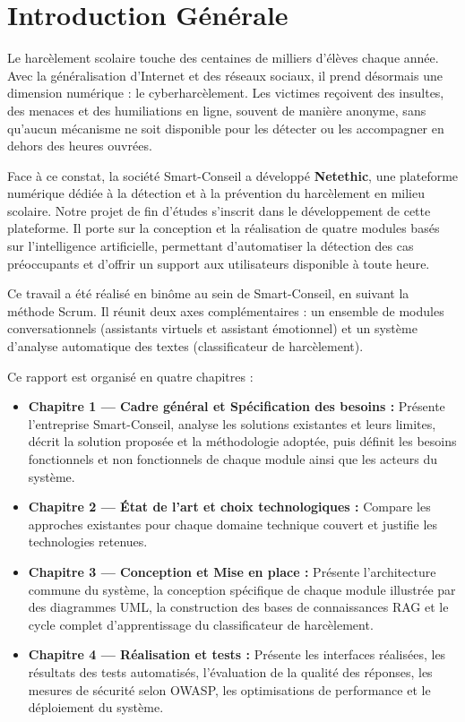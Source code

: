 
\chapter*{Introduction Générale}

Le harcèlement scolaire touche des centaines de milliers d'élèves chaque année.
Avec la généralisation d'Internet et des réseaux sociaux, il prend désormais une dimension numérique : le cyberharcèlement.
Les victimes reçoivent des insultes, des menaces et des humiliations en ligne, souvent de manière anonyme,
sans qu'aucun mécanisme ne soit disponible pour les détecter ou les accompagner en dehors des heures ouvrées.

\bigskip

Face à ce constat, la société Smart-Conseil a développé \textbf{Netethic}, une plateforme numérique dédiée
à la détection et à la prévention du harcèlement en milieu scolaire.
Notre projet de fin d'études s'inscrit dans le développement de cette plateforme.
Il porte sur la conception et la réalisation de quatre modules basés sur l'intelligence artificielle,
permettant d'automatiser la détection des cas préoccupants et d'offrir un support aux utilisateurs
disponible à toute heure.

\bigskip

Ce travail a été réalisé en binôme au sein de Smart-Conseil, en suivant la méthode Scrum.
Il réunit deux axes complémentaires : un ensemble de modules conversationnels (assistants virtuels et assistant émotionnel)
et un système d'analyse automatique des textes (classificateur de harcèlement).

\bigskip

Ce rapport est organisé en quatre chapitres :

\begin{itemize}
  \item \textbf{Chapitre 1 — Cadre général et Spécification des besoins :}
        Présente l'entreprise Smart-Conseil, analyse les solutions existantes et leurs limites,
        décrit la solution proposée et la méthodologie adoptée, puis définit les besoins
        fonctionnels et non fonctionnels de chaque module ainsi que les acteurs du système.
  \item \textbf{Chapitre 2 — État de l'art et choix technologiques :}
        Compare les approches existantes pour chaque domaine technique couvert
        et justifie les technologies retenues.
  \item \textbf{Chapitre 3 — Conception et Mise en place :}
        Présente l'architecture commune du système, la conception spécifique de chaque module
        illustrée par des diagrammes UML, la construction des bases de connaissances RAG
        et le cycle complet d'apprentissage du classificateur de harcèlement.
  \item \textbf{Chapitre 4 — Réalisation et tests :}
        Présente les interfaces réalisées, les résultats des tests automatisés, l'évaluation
        de la qualité des réponses, les mesures de sécurité selon OWASP, les optimisations
        de performance et le déploiement du système.
\end{itemize}
